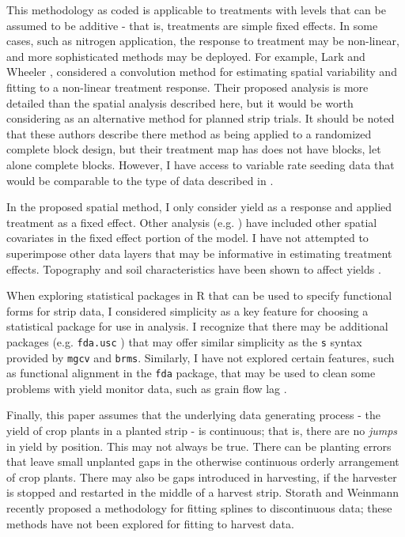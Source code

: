 \documentclass[phdcss]{SDSUThesis}
\begin{document}
This methodology as coded is applicable to treatments with levels that can be assumed to be additive - that is, treatments are simple fixed effects. In some cases, such as nitrogen application, the response to treatment may be non-linear, and more sophisticated methods may be deployed. For example, Lark and Wheeler \cite{lark-09-2003}, considered a convolution method for estimating spatial variability and fitting to a non-linear treatment response. Their proposed analysis is more detailed than the spatial analysis described here, but it would be worth considering as an alternative method for planned strip trials. It should be noted that these authors describe there method as being applied to a randomized complete block design, but their treatment map has does not have blocks, let alone complete blocks. However, I have access to variable rate seeding data that would be comparable to the type of data described in \cite{lark-09-2003}. 

In the proposed spatial method, I only consider yield as a response and applied treatment as a fixed effect. Other analysis (e.g. \cite{kravchenko-2000}) have included other spatial covariates in the fixed effect portion of the model. I have not attempted to superimpose other data layers that may be informative in estimating treatment effects. Topography and soil characteristics have been shown to affect yields \cite{kravchenko-2000, jiang.p-01-2004}.

When exploring statistical packages in R that can be used to specify functional forms for strip data, I considered simplicity as a key feature for choosing a statistical package for use in analysis. I recognize that there may be additional packages (e.g. \texttt{fda.usc} \cite{febrero-bande-2012}) that may offer similar simplicity as the \texttt{s} syntax provided by \texttt{mgcv} and \texttt{brms}. Similarly, I have not explored certain features, such as functional alignment in the \texttt{fda} package, that may be used to clean some problems with yield monitor data, such as grain flow lag \cite{chung-2002}.

Finally, this paper assumes that the underlying data generating process - the yield of crop plants in a planted strip - is continuous; that is, there are no \textit{jumps} in yield by position. This may not always be true. There can be planting errors that leave small unplanted gaps in the otherwise continuous orderly arrangement of crop plants. There may also be gaps introduced in harvesting, if the harvester is stopped and restarted in the middle of a harvest strip. Storath and Weinmann \cite{storath-11-2023} recently proposed a methodology for fitting splines to discontinuous data; these methods have not been explored for fitting to harvest data.
\end{document}
